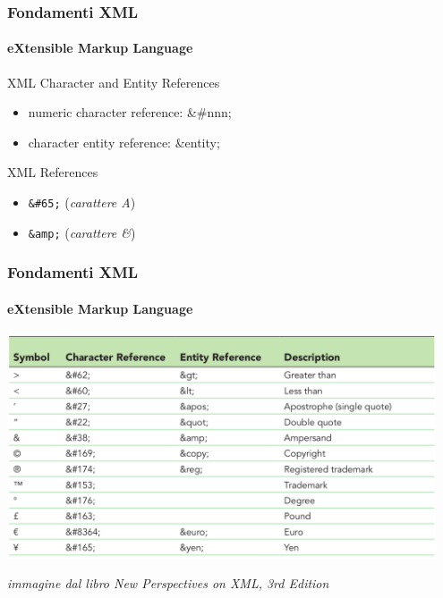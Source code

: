 \begin{frame}
    \frametitle{Fondamenti XML}
    \framesubtitle{eXtensible Markup Language}
    \addtocounter{nframe}{1}

	\begin{block}{XML Character and Entity References}
		\begin{itemize}
			\item numeric character reference: \&\#nnn;
			\item character entity reference: \&entity;
		\end{itemize}
	\end{block}

	\begin{block}{XML References}
		\begin{itemize}
			\item \texttt{\&\#65;} (\textit{carattere A})
			\item \texttt{\&amp;} (\textit{carattere \&})
		\end{itemize}
	\end{block}

\end{frame}


\begin{frame}
	\frametitle{Fondamenti XML}
	\framesubtitle{eXtensible Markup Language}
	\addtocounter{nframe}{1}

	\begin{center}
			\includegraphics[width=0.95\textwidth]{imgs/xml-Character-Entity.png}
	\end{center}
\begin{tiny}\textit{immagine dal libro New Perspectives on XML, 3rd Edition}\end{tiny}
\end{frame}


